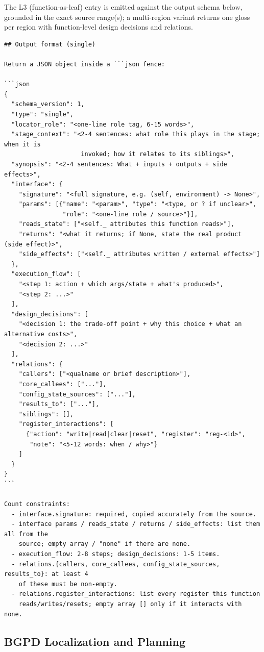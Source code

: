 \documentclass[]{ailab}
\begin{document}
The L3 (function-as-leaf) entry is emitted against the output schema below,
grounded in the exact source range(s); a multi-region variant returns one gloss
per region with function-level design decisions and relations.

\begin{lstlisting}[style=promptbox]
## Output format (single)

Return a JSON object inside a ```json fence:

```json
{
  "schema_version": 1,
  "type": "single",
  "locator_role": "<one-line role tag, 6-15 words>",
  "stage_context": "<2-4 sentences: what role this plays in the stage; when it is
                     invoked; how it relates to its siblings>",
  "synopsis": "<2-4 sentences: What + inputs + outputs + side effects>",
  "interface": {
    "signature": "<full signature, e.g. (self, environment) -> None>",
    "params": [{"name": "<param>", "type": "<type, or ? if unclear>",
                "role": "<one-line role / source>"}],
    "reads_state": ["<self._ attributes this function reads>"],
    "returns": "<what it returns; if None, state the real product (side effect)>",
    "side_effects": ["<self._ attributes written / external effects>"]
  },
  "execution_flow": [
    "<step 1: action + which args/state + what's produced>",
    "<step 2: ...>"
  ],
  "design_decisions": [
    "<decision 1: the trade-off point + why this choice + what an alternative costs>",
    "<decision 2: ...>"
  ],
  "relations": {
    "callers": ["<qualname or brief description>"],
    "core_callees": ["..."],
    "config_state_sources": ["..."],
    "results_to": ["..."],
    "siblings": [],
    "register_interactions": [
      {"action": "write|read|clear|reset", "register": "reg-<id>",
       "note": "<5-12 words: when / why>"}
    ]
  }
}
```

Count constraints:
  - interface.signature: required, copied accurately from the source.
  - interface params / reads_state / returns / side_effects: list them all from the
    source; empty array / "none" if there are none.
  - execution_flow: 2-8 steps; design_decisions: 1-5 items.
  - relations.{callers, core_callees, config_state_sources, results_to}: at least 4
    of these must be non-empty.
  - relations.register_interactions: list every register this function
    reads/writes/resets; empty array [] only if it interacts with none.
\end{lstlisting}

\subsection{BGPD Localization and Planning}
\label{sec:d-bgpd}
\end{document}

